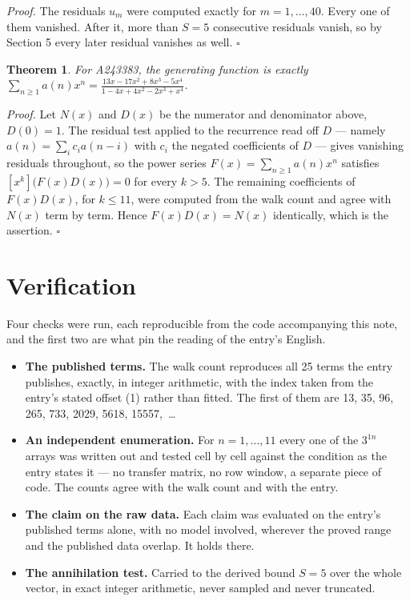 \documentclass[11pt]{article}
\newtheorem{theorem}{Theorem}
\theoremstyle{definition}
\begin{document}
{\itshape Proof.} The residuals $u_m$ were computed exactly for $m = 1,\dots,40$. Every one of them vanished. After it, more than $S = 5$ consecutive residuals vanish, so by Section 5 every later residual vanishes as well. $\square$

\begin{theorem} For A243383, the generating function is exactly $\sum_{n\ge 1} a(n)x^n = \frac{13x - 17x^{2} + 8x^{3} - 5x^{4}}{1 - 4x + 4x^{2} - 2x^{3} + x^{4}}$.\end{theorem}

{\itshape Proof.} Let $N(x)$ and $D(x)$ be the numerator and denominator above, $D(0)=1$. The residual test applied to the recurrence read off $D$ --- namely $a(n) = \sum_i c_i a(n-i)$ with $c_i$ the negated coefficients of $D$ --- gives vanishing residuals throughout, so the power series $F(x)=\sum_{n\ge 1}a(n)x^n$ satisfies $[x^k]\bigl(F(x)D(x)\bigr) = 0$ for every $k > 5$. The remaining coefficients of $F(x)D(x)$, for $k \le 11$, were computed from the walk count and agree with $N(x)$ term by term. Hence $F(x)D(x) = N(x)$ identically, which is the assertion. $\square$

\section{Verification}

Four checks were run, each reproducible from the code accompanying this note, and the first two are what pin the reading of the entry's English.

\begin{itemize}

\item {\bfseries The published terms.} The walk count reproduces all 25 terms the entry publishes, exactly, in integer arithmetic, with the index taken from the entry's stated offset (1) rather than fitted. The first of them are 13, 35, 96, 265, 733, 2029, 5618, 15557,~\dots

\item {\bfseries An independent enumeration.} For $n = 1,\dots,11$ every one of the $3^{1n}$ arrays was written out and tested cell by cell against the condition as the entry states it --- no transfer matrix, no row window, a separate piece of code. The counts agree with the walk count and with the entry.

\item {\bfseries The claim on the raw data.} Each claim was evaluated on the entry's published terms alone, with no model involved, wherever the proved range and the published data overlap. It holds there.

\item {\bfseries The annihilation test.} Carried to the derived bound $S = 5$ over the whole vector, in exact integer arithmetic, never sampled and never truncated.

\end{itemize}
\end{document}
